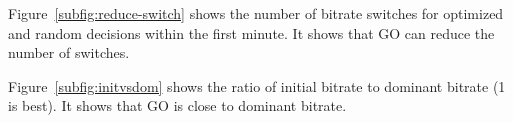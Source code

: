 
Figure~\ref{subfig:reduce-switch} shows the number of bitrate switches for optimized and random decisions within the first minute. 
It shows that GO can reduce the number of switches.


Figure~\ref{subfig:initvsdom} shows the ratio of initial bitrate to dominant bitrate (1 is best). It shows that GO is close to dominant bitrate.
